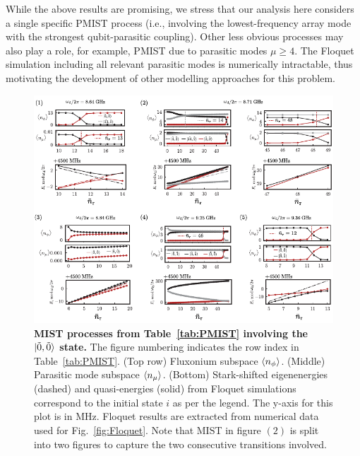 \documentclass[%
reprint,
superscriptaddress,
 amsmath,amssymb,
 aps,
 prx,
longbibliography,
floatfix,
]{revtex4-2}
\begin{document}
While the above results are promising, we stress that our analysis here considers a single specific PMIST process (i.e., involving the lowest-frequency array mode with the strongest qubit-parasitic coupling). Other less obvious processes may also play a role, for example, PMIST due to parasitic modes $\mu \geq4$. The Floquet simulation including all relevant parasitic modes is numerically intractable, 
thus motivating the development of other modelling approaches for this problem.
\begin{figure}
    \centering
    \includegraphics[width=1.0\textwidth]{Supp_Fig/Trans0.pdf}
    \caption{\textbf{MIST processes from Table~\ref{tab:PMIST} involving the $\ket{\tilde{0},\tilde{0}}$ state.} The figure numbering indicates the row index in Table~\ref{tab:PMIST}. (Top row) Fluxonium subspace $\braket{n_\phi}$. (Middle) Parasitic mode subspace $\braket{n_\mu}$. (Bottom) Stark-shifted eigenenergies (dashed) and quasi-energies (solid) from Floquet simulations correspond to the initial state $i$ as per the legend. The y-axis for this plot is in MHz. Floquet results are extracted from numerical data used for Fig.~\ref{fig:Floquet}. Note that MIST in figure $(2)$ is split into two figures to capture the two consecutive transitions involved.}
    \label{fig:Trans0}
\end{figure}
\end{document}
